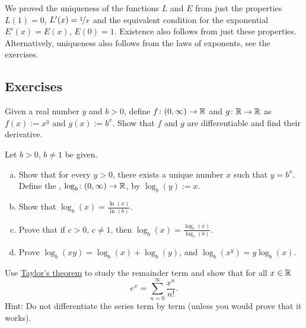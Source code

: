 \begin{remark}
We proved the uniqueness of the functions $L$ and $E$ from
just the properties $L(1)=0$, $L'(x) = \nicefrac{1}{x}$
and the equivalent condition for the exponential
$E'(x) = E(x)$, $E(0) = 1$.  Existence also follows
from just these properties.
Alternatively, uniqueness also follows
from the laws of exponents, see the exercises.
\end{remark}

\subsection{Exercises}

\begin{exercise}
Given a real number $y$ and $b > 0$, define $f \colon (0,\infty) \to {\mathbb{R}}$
and $g \colon {\mathbb{R}} \to {\mathbb{R}}$ as $f(x) := x^y$ and $g(x) := b^x$.  Show that $f$
and $g$ are differentiable and find their derivative.
\end{exercise}

\begin{samepage}
\begin{exercise} \label{exercise:otherlogbases}
Let $b > 0$, $b\neq 1$ be given.
\begin{enumerate}[a)]
\item
Show that for every $y > 0$, there exists a unique number $x$
such that $y = b^x$.  Define
the \emph{},
$\log_b \colon (0,\infty) \to {\mathbb{R}}$, by
$\log_b(y) := x$.
\item
Show that $\log_b(x) = \frac{\ln(x)}{\ln(b)}$.
\item
Prove that if $c > 0$, $c \neq 1$, then
$\log_b(x) = \frac{\log_c(x)}{\log_c(b)}$.
\item
Prove $\log_b(xy) =
\log_b(x)+\log_b(y)$, and $\log_b(x^y) = y \log_b(x)$.
\end{enumerate}
\end{exercise}
\end{samepage}

\begin{exercise}
Use \hyperref[thm:taylor]{Taylor's theorem} to study the remainder term and show that for
all $x \in {\mathbb{R}}$
\begin{equation*}
e^x = \sum_{n=0}^\infty \frac{x^n}{n!} .
\end{equation*}
Hint: Do not differentiate the series term by term (unless you would prove that it
works).
\end{exercise}

